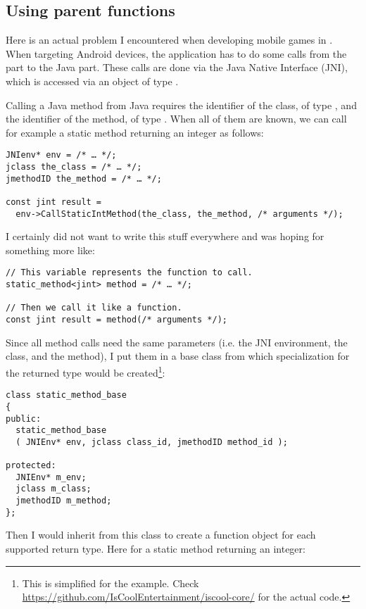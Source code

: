 \subsection{Using parent functions}

Here is an actual problem I encountered when developing mobile games
in \cpp{}. When targeting Android devices, the application has to do
some calls from the \cpp{} part to the Java part. These calls are done
via the Java Native Interface (JNI), which is accessed via an object
of type .

Calling a Java method from Java requires the identifier of the class,
of type , and the identifier of the method, of type
. When all of them are known, we can call for example
a static method returning an integer as follows:

\begin{lstlisting}
JNIenv* env = /* … */;
jclass the_class = /* … */;
jmethodID the_method = /* … */;

const jint result =
  env->CallStaticIntMethod(the_class, the_method, /* arguments */);
\end{lstlisting}

I certainly did not want to write this stuff everywhere and was hoping
for something more like:

\begin{lstlisting}
// This variable represents the function to call.
static_method<jint> method = /* … */;

// Then we call it like a function.
const jint result = method(/* arguments */);
\end{lstlisting}

Since all method calls need the same parameters (i.e. the JNI
environment, the class, and the method), I put them in a base class
from which specialization for the returned type would be
created\footnote{This is simplified for the example. Check
  \url{https://github.com/IsCoolEntertainment/iscool-core/} for the
  actual code.}:

\begin{lstlisting}
class static_method_base
{
public:
  static_method_base
  ( JNIEnv* env, jclass class_id, jmethodID method_id );

protected:
  JNIEnv* m_env;
  jclass m_class;
  jmethodID m_method;
};
\end{lstlisting}

Then I would inherit from this class to create a function object for
each supported return type. Here for a static method returning an
integer:

